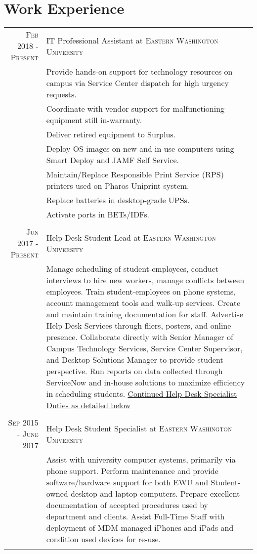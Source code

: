 \documentclass[a4paper,10pt]{article}
\begin{document}
\section{Work Experience}
\begin{tabular}{r|p{14cm}}
\textsc{Feb 2018 - Present} & IT Professional Assistant at \textsc{Eastern Washington University}\\
	& \textbullet Provide hands-on support for technology resources on campus via Service Center dispatch for high urgency requests.\\
	& \textbullet Coordinate with vendor support for malfunctioning equipment still in-warranty.\\
	& \textbullet Deliver retired equipment to Surplus. \\
	& \textbullet Deploy OS images on new and in-use computers using Smart Deploy and JAMF Self Service.\\
	& \textbullet Maintain/Replace Responsible Print Service (RPS) printers used on Pharos Uniprint system.\\
	& \textbullet Replace batteries in desktop-grade UPSs. \\
	& \textbullet Activate ports in BETs/IDFs.\\
	\multicolumn{2}{c}{} \\
 \textsc{Jun 2017 - Present} & Help Desk Student Lead at \textsc{Eastern Washington University} \\
&\footnotesize{Manage scheduling of student-employees, conduct interviews to hire new workers, manage conflicts between employees. Train student-employees on phone systems, account management tools and walk-up services. Create and maintain training documentation for staff. Advertise Help Desk Services through fliers, posters, and online presence. Collaborate directly with Senior Manager of Campus Technology Services, Service Center Supervisor, and Desktop Solutions Manager to provide student perspective. Run reports on data collected through ServiceNow and in-house solutions to maximize efficiency in scheduling students.} \underline{Continued Help Desk Specialist Duties as detailed below}\\\multicolumn{2}{c}{} \\
\textsc{Sep 2015 - June 2017} & Help Desk Student Specialist at \textsc{Eastern Washington University}\\
& \footnotesize{Assist with university computer systems, primarily via phone support. Perform maintenance and provide software/hardware support for both EWU and Student-owned desktop and laptop computers. Prepare excellent documentation of accepted procedures used by department and clients. Assist Full-Time Staff with deployment of MDM-managed iPhones and iPads and condition used devices for re-use.}\\\multicolumn{2}{c}{}\\

\end{tabular}
\end{document}
